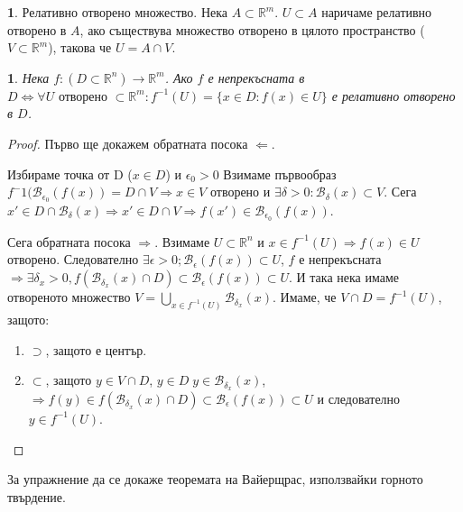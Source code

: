 \documentclass[11pt]{article}
\numberwithin{equation}{section}
\numberwithin{figure}{section}
\numberwithin{table}{section}
\theoremstyle{plain}
\theoremstyle{definition}
\newtheorem{defn}[thm]{\protect\definitionname}
\theoremstyle{remark}
\theoremstyle{definition}
\theoremstyle{remark}
\theoremstyle{plain}
\theoremstyle{definition}
\theoremstyle{definition}
\theoremstyle{plain}
\theoremstyle{plain}
\newtheorem{prop}[thm]{\protect\propositionname}
\theoremstyle{plain}
\theoremstyle{definition}
\theoremstyle{plain}
\providecommand{\definitionname}{Дефиниция}
\providecommand{\propositionname}{Твърдение}
\newcommand*{\B}{\mathcal{B}}
\newcommand*{\R}{\mathbb{R}}
\begin{document}
\begin{defn}
Релативно отворено множество.
Нека $A \subset \R^m$. $U\subset A$ наричаме релативно отворено в $A$, ако съществува множество отворено в цялото пространство ($V\subset \R^m$), такова че $U = A\cap V$.
\end{defn}

\begin{prop}
Нека $f: (D\subset \R^n) \rightarrow \R^m$. Ако $f$ е непрекъсната в $D \iff \forall U \text{ отворено } \subset \R^m: f^{-1} (U) = \{x\in D: f(x) \in U\}$ е релативно отворено в $D$.
\end{prop}

\begin{proof}
Първо ще докажем обратната посока $\Leftarrow$.

Избираме точка от D ($x\in D$) и $\epsilon_0 >0$ Взимаме първообраз $f^-1 (\B_{\epsilon_0}(f(x)) = D \cap V \Rightarrow x \in V$ отворено и $\exists \delta >0 : \B_\delta (x) \subset V$. Сега $x' \in D \cap \B_\delta(x) \Rightarrow x' \in D\cap V \Rightarrow f(x') \in \B_{\epsilon_0}(f(x))$.

Сега обратната посока $\Rightarrow$.
Взимаме $U \subset \R^n$ и $x\in f^{-1} (U) \Rightarrow f(x) \in U$ отворено. Следователно $\exists \epsilon >0 ; \B_\epsilon(f(x)) \subset U$, $f$ е непрекъсната $\Rightarrow \exists \delta_x >0, f(\B_{\delta_x}(x)\cap D) \subset \B_\epsilon (f(x)) \subset U$. И така нека имаме отвореното множество $V = \bigcup_{x \in f^{-1}(U)} \B_{\delta_x}(x)$. Имаме, че $V\cap D = f^{-1} (U)$, защото:
\begin{enumerate}
	\item $\supset$, защото е център.
	\item $\subset$, защото $y \in V \cap D$, $y \in D \; y\in \B_{\delta_x}(x)$, $\Rightarrow f(y) \in f(\B_{\delta_x}(x)\cap D) \subset \B_\epsilon (f(x)) \subset U$ и следователно $y \in f^{-1} (U)$. 
\end{enumerate}
\end{proof}
За упражнение да се докаже теоремата на Вайерщрас, използвайки горното твърдение.
\end{document}
